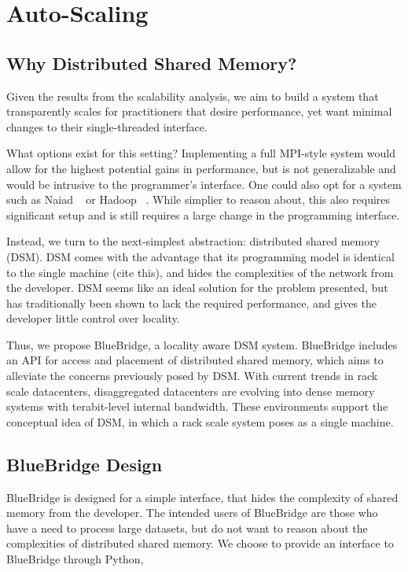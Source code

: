 \section{Auto-Scaling}
\label{sec:autoscaling}

\subsection{Why Distributed Shared Memory?}

Given the results from the scalability analysis, we aim to build a system that
transparently scales for practitioners that desire performance, yet want minimal
changes to their single-threaded interface.

What options exist for this setting? Implementing a full MPI-style system would
allow for the highest potential gains in performance, but is not generalizable
and would be intrusive to the programmer's interface. One could also opt for a system
such as Naiad ~\cite{Murray:2013:NTD:2517349.2522738} or 
Hadoop ~\cite{Vavilapalli:2013:AHY:2523616.2523633}. While simplier to reason about, 
this also requires significant setup and is still requires a large change in the 
programming interface. 

Instead, we turn to the next-simplest abstraction: distributed shared memory (DSM).
DSM comes with the advantage that its programming model is identical to the
single machine (cite this), and hides the complexities of the network from the
developer. DSM seems like an ideal solution for the problem presented, but has
traditionally been shown to lack the required performance, and gives the developer
little control over locality. 

Thus, we propose BlueBridge, a locality aware DSM system. BlueBridge includes
an API for access and placement of distributed shared memory, which aims to
alleviate the concerns previously posed by DSM. With current trends in rack
scale datacenters, disaggregated datacenters are evolving into dense memory
systems with terabit-level internal bandwidth. These environments support the 
conceptual idea of DSM, in which a rack scale system poses as a single machine. 

\subsection{BlueBridge Design}

BlueBridge is designed for a simple interface, that hides the complexity of
shared memory from the developer. The intended users of BlueBridge are those who
have a need to process large datasets, but do not want to reason about the
complexities of distributed shared memory. We choose to provide an interface
to BlueBridge through Python, 

